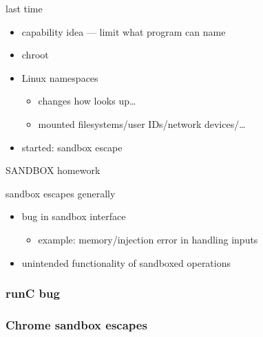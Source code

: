 \date{}
\title{}
\date{}
\usepackage[outputdir=latex.out]{minted}

\begin{frame}
    \titlepage
\end{frame}



\begin{frame}{last time}
    \begin{itemize}
    \item capability idea --- limit what program can name
    \item chroot
    \item Linux namespaces
        \begin{itemize}
        \item changes how looks up\ldots
        \item mounted filesystems/user IDs/network devices/\ldots
        \end{itemize}
    \vspace{.5cm}
    \item started: sandbox escape
    \end{itemize}
\end{frame}

\begin{frame}{SANDBOX homework}
\end{frame}

\begin{frame}{sandbox escapes generally}
    \begin{itemize}
    \item bug in sandbox interface
        \begin{itemize}
        \item example: memory/injection error in handling inputs
        \end{itemize}
    \item unintended functionality of sandboxed operations
    \end{itemize}
\end{frame}

\subsubsection{runC bug}


\subsubsection{Chrome sandbox escapes}



